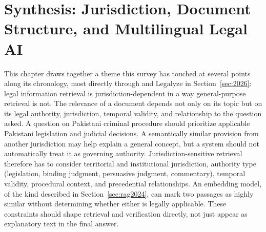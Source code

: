 \section{Synthesis: Jurisdiction, Document Structure, and Multilingual Legal AI}
\label{sec:jurisdiction}

This chapter draws together a theme this survey has touched at several points along its chronology,
most directly through \citet{ref312025} and Legalyze \citep{hamza2026} in Section~\ref{sec:2026}:
legal information retrieval is jurisdiction-dependent in a way general-purpose retrieval is not. The
relevance of a document depends not only on its topic but on its legal authority, jurisdiction,
temporal validity, and relationship to the question asked. A question on Pakistani criminal
procedure should prioritize applicable Pakistani legislation and judicial decisions. A semantically
similar provision from another jurisdiction may help explain a general concept, but a system should
not automatically treat it as governing authority. Jurisdiction-sensitive retrieval therefore has to
consider territorial and institutional jurisdiction, authority type (legislation, binding judgment,
persuasive judgment, commentary), temporal validity, procedural context, and precedential
relationships. An embedding model, of the kind described in Section~\ref{sec:rag2024}, can mark two
passages as highly similar without determining whether either is legally applicable. These
constraints should shape retrieval and verification directly, not just appear as explanatory text in
the final answer.

